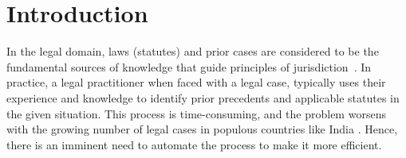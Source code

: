 \section{Introduction} \label{sec:introduction}


\noindent In the legal domain, laws (statutes) and prior cases are considered to be the fundamental sources of knowledge that guide principles of jurisdiction~\cite{joshi2023ucreat}. 
In practice, a legal practitioner when faced with a legal case, typically uses their experience and knowledge to identify prior precedents and applicable statutes in the given situation. 
This process is time-consuming, and the problem worsens with the growing number of legal cases in populous countries like India \cite{malik2021ildc}. Hence, there is an imminent need to automate the process to make it more efficient. 

